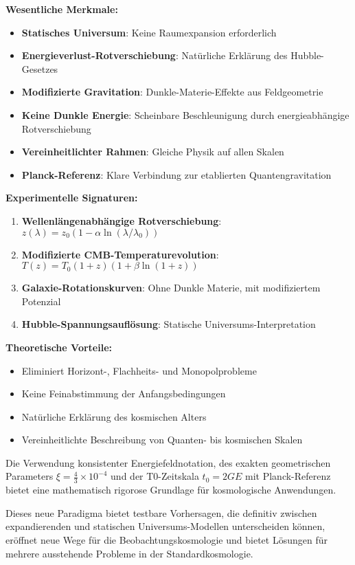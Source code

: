 \documentclass[12pt,a4paper]{report}
\newcommand{\tzero}{t_0}                  %
\begin{document}
	\textbf{Wesentliche Merkmale:}
	\begin{itemize}
		\item \textbf{Statisches Universum}: Keine Raumexpansion erforderlich
		\item \textbf{Energieverlust-Rotverschiebung}: Natürliche Erklärung des Hubble-Gesetzes
		\item \textbf{Modifizierte Gravitation}: Dunkle-Materie-Effekte aus Feldgeometrie
		\item \textbf{Keine Dunkle Energie}: Scheinbare Beschleunigung durch energieabhängige Rotverschiebung
		\item \textbf{Vereinheitlichter Rahmen}: Gleiche Physik auf allen Skalen
		\item \textbf{Planck-Referenz}: Klare Verbindung zur etablierten Quantengravitation
	\end{itemize}
	
	\textbf{Experimentelle Signaturen:}
	\begin{enumerate}
		\item \textbf{Wellenlängenabhängige Rotverschiebung}: $z(\lambda) = z_0(1 - \alpha \ln(\lambda/\lambda_0))$
		\item \textbf{Modifizierte CMB-Temperaturevolution}: $T(z) = T_0(1+z)(1 + \beta \ln(1+z))$
		\item \textbf{Galaxie-Rotationskurven}: Ohne Dunkle Materie, mit modifiziertem Potenzial
		\item \textbf{Hubble-Spannungsauflösung}: Statische Universums-Interpretation
	\end{enumerate}
	
	\textbf{Theoretische Vorteile:}
	\begin{itemize}
		\item Eliminiert Horizont-, Flachheits- und Monopolprobleme
		\item Keine Feinabstimmung der Anfangsbedingungen
		\item Natürliche Erklärung des kosmischen Alters
		\item Vereinheitlichte Beschreibung von Quanten- bis kosmischen Skalen
	\end{itemize}
	
	Die Verwendung konsistenter Energiefeldnotation, des exakten geometrischen Parameters $\xi = \frac{4}{3} \times 10^{-4}$ und der T0-Zeitskala $\tzero = 2GE$ mit Planck-Referenz bietet eine mathematisch rigorose Grundlage für kosmologische Anwendungen.
	
	Dieses neue Paradigma bietet testbare Vorhersagen, die definitiv zwischen expandierenden und statischen Universums-Modellen unterscheiden können, eröffnet neue Wege für die Beobachtungskosmologie und bietet Lösungen für mehrere ausstehende Probleme in der Standardkosmologie.
	
\end{document}
